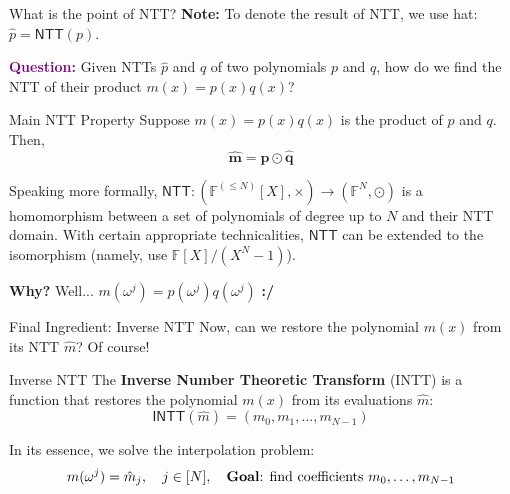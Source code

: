 \documentclass{zkdl-presentation-template}
\begin{document}
    \begin{frame}{What is the point of NTT?}
        \textcolor{green!60!black}{\textbf{Note:}} To denote the result of NTT, we use hat: $\hat{p} = \mathsf{NTT}(p)$.

        \textcolor{purple}{\textbf{Question:}} Given NTTs $\hat{p}$ and $\hat{q}$ of two polynomials $p$ and $q$, 
        how do we find the NTT of their product $m(x) = p(x)q(x)$?

        \begin{block}{Main NTT Property}
            Suppose $m(x) = p(x)q(x)$ is the product of $p$ and $q$. Then,
            \begin{equation*}
                \hat{\boldsymbol{m}} = \hat{\boldsymbol{p}} \odot \hat{\boldsymbol{q}}
            \end{equation*}
        
            Speaking more formally, $\mathsf{NTT}: (\mathbb{F}^{(\leq N)}[X],\times) \to (\mathbb{F}^N, \odot)$ is 
            a homomorphism between a set of polynomials of degree up to $N$ and their NTT domain. With certain 
            appropriate technicalities, $\mathsf{NTT}$ can be extended to the isomorphism (namely, use $\mathbb{F}[X] / (X^N-1)$).
        \end{block}

        \textcolor{blue!60!black}{\textbf{Why?}} Well... $m(\omega^j)=p(\omega^j)q(\omega^j)$ \hspace{20px} \textbf{:/}
    \end{frame}

    \begin{frame}{Final Ingredient: Inverse NTT}
        Now, can we restore the polynomial $m(x)$ from its NTT $\hat{m}$? Of course!

        \begin{definition}{Inverse NTT}
            The \textbf{Inverse Number Theoretic Transform} (INTT) is a function 
            that restores the polynomial $m(x)$ from its evaluations $\hat{m}$:
            \begin{equation*}
                \mathsf{INTT}(\hat{m}) = (m_0,m_1,\dots,m_{N-1})
            \end{equation*}
        \end{definition}

        In its essence, we solve the interpolation problem:
        \begin{equation*}
            m(\omega^j) = \hat{m}_j, \quad j \in [N], \quad \text{\textbf{Goal}: find coefficients $m_0,\dots,m_{N-1}$}
        \end{equation*}
    \end{frame}
\end{document}

